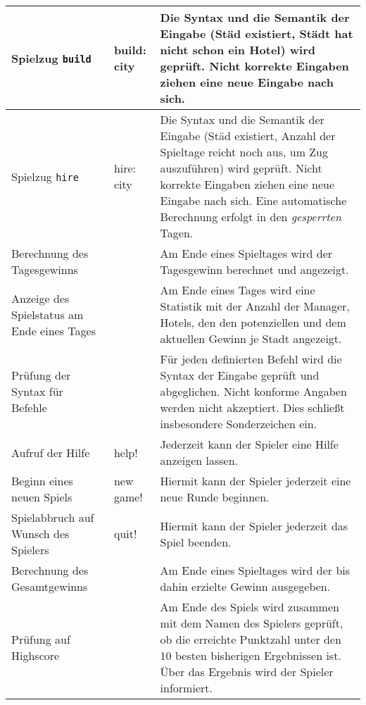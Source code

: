 \documentclass[a4paper]{article}
\begin{document}
\begin{exercise}{1}
\begin{center}
\begin{tabular}{| p{2.5cm} | p{2.2cm} | p{10cm} |}
		Spielzug \texttt{build} & build: city
		& Die Syntax und die Semantik der Eingabe (St\"ad existiert, St\"adt hat nicht schon ein
		Hotel) wird gepr\"uft. Nicht korrekte Eingaben
		ziehen eine neue Eingabe nach sich. \\ \hline
		
		Spielzug \texttt{hire} & hire: city
		& Die Syntax und die Semantik der Eingabe (St\"ad existiert, Anzahl der Spieltage reicht noch
		aus, um Zug auszuf\"uhren) wird gepr\"uft. Nicht korrekte Eingaben
		ziehen eine neue Eingabe nach sich. Eine automatische Berechnung erfolgt in den
		\emph{gesperrten} Tagen. \\ \hline
		
		Berechnung des Tagesgewinns &
		& Am Ende eines Spieltages wird der Tagesgewinn berechnet und angezeigt. \\ \hline
		
		Anzeige des Spielstatus am Ende eines Tages &
		& Am Ende eines Tages wird eine Statistik mit der Anzahl der Manager, Hotels, den
		den potenziellen und dem aktuellen Gewinn je Stadt angezeigt. \\ \hline
		
		Pr\"ufung der Syntax f\"ur Befehle &
		& F\"ur jeden definierten Befehl wird die Syntax der Eingabe gepr\"uft und abgeglichen.
		Nicht konforme Angaben werden nicht akzeptiert. Dies schlie\ss{}t insbesondere Sonderzeichen
		ein. \\ \hline
		
		Aufruf der Hilfe & help!
		& Jederzeit kann der Spieler eine Hilfe anzeigen lassen. \\ \hline
	
		Beginn eines neuen Spiels & new game!
		& Hiermit kann der Spieler jederzeit eine neue Runde beginnen. \\ \hline
		
		Spielabbruch auf Wunsch des Spielers & quit!
		& Hiermit kann der Spieler jederzeit das Spiel beenden. \\ \hline
		
		Berechnung des Gesamtgewinns &
		& Am Ende eines Spieltages wird der bis dahin erzielte Gewinn ausgegeben. \\ \hline
		
		Pr\"ufung auf Highscore &
		& Am Ende des Spiels wird zusammen mit dem Namen des Spielers gepr\"uft,
		ob die erreichte Punktzahl unter den 10 besten bisherigen Ergebnissen ist. \"Uber
		das Ergebnis wird der Spieler informiert. \\ \hline


\end{tabular}
\end{center}
\end{exercise}
\end{document}
